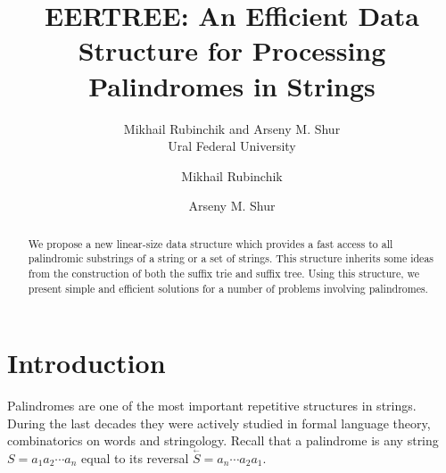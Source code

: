 \documentclass{llncs}
\newcommand{\lvec}[1]{\overset{{}_{\leftarrow}}{#1}}
\begin{document}
\thispagestyle{empty}

\title{EERTREE: An Efficient Data Structure for Processing Palindromes in Strings} 
\author{{Mikhail Rubinchik and Arseny M. Shur \\Ural Federal University}}

\author{Mikhail Rubinchik \and Arseny M. Shur}

\maketitle

\vspace*{-4mm}
\begin{abstract}
We propose a new linear-size data structure which provides a fast access to all palindromic substrings of a string or a set of strings. This structure inherits some ideas from the construction of both the suffix trie and suffix tree. Using this structure, we present simple and efficient solutions for a number of problems involving palindromes.\\[2pt]
\end{abstract}


\section{Introduction}

Palindromes are one of the most important repetitive structures in strings. During the last decades they were actively studied in formal language theory, combinatorics on words and stringology. Recall that a palindrome is any string $S = a_1a_2\cdots a_n$ equal to its reversal $\lvec{S} = a_n\cdots a_2a_1$.
\end{document}
